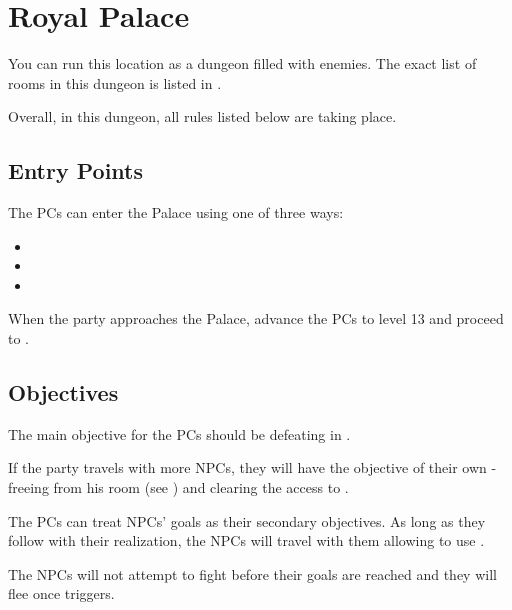 \section{Royal Palace}
\label{sec:kholinarPalace}

You can run this location as a dungeon filled with enemies. The exact list of rooms in this dungeon is listed in .

Overall, in this dungeon, all rules listed below are taking place.


\subsection{Entry Points}

The PCs can enter the Palace using one of three ways:

\begin{itemize}
	\item {}
	\item {}
	\item {}
\end{itemize}

When the party approaches the Palace, advance the PCs to level 13 and proceed to .



\subsection{Objectives}

The main objective for the PCs should be defeating \npcQueen{} in .

If the party travels with more NPCs, they will have the objective of their own - freeing \npcGavinor{} from his room  (see ) and clearing the access to .

The PCs can treat NPCs' goals as their secondary objectives. As long as they follow with their realization, the NPCs will travel with them allowing to use . 

The NPCs will not attempt to fight \npcQueen{} before their goals are reached and they will flee once  triggers.



